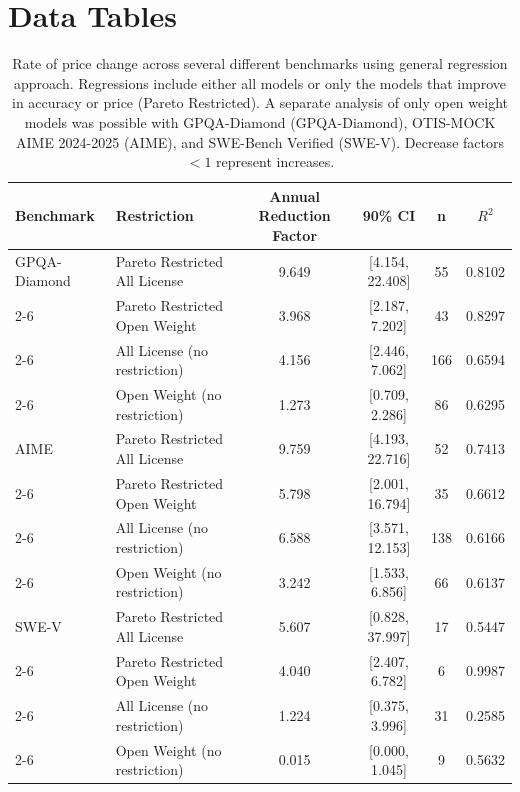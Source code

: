 \section{Data Tables}

\renewcommand{\arraystretch}{1.2}

\begin{table}[h!]
\centering
\caption{Rate of price change across several different benchmarks using general regression approach. Regressions include either all models or only the models that improve in accuracy or price (Pareto Restricted). A separate analysis of only open weight models was possible with GPQA-Diamond (GPQA-Diamond), OTIS-MOCK AIME 2024-2025 (AIME), and SWE-Bench Verified (SWE-V). Decrease factors $<1$ represent increases.}
\label{tab:regression_results}

\begin{tabular}{|l|l|c|c|c|c|}
\hline
\textbf{Benchmark} & \textbf{Restriction} & \textbf{Annual Reduction Factor} & \textbf{90\% CI} & \textbf{n} & \textbf{$R^2$} \\
\hline

GPQA-Diamond & Pareto Restricted All License & 9.649 & [4.154, 22.408] & 55 & 0.8102 \\ \cline{2-6}
\rowcolor{restrgray} \cellcolor{white} & Pareto Restricted Open Weight & 3.968 & [2.187, 7.202] & 43 & 0.8297 \\ \cline{2-6}
\cellcolor{white} & All License (no restriction) & 4.156 & [2.446, 7.062] & 166 & 0.6594 \\ \cline{2-6}
\rowcolor{restrgray} \cellcolor{white} & Open Weight (no restriction) & 1.273 & [0.709, 2.286] & 86 & 0.6295 \\
\hline

AIME & Pareto Restricted All License & 9.759 & [4.193, 22.716] & 52 & 0.7413 \\ \cline{2-6}
\rowcolor{restrgray} \cellcolor{white} & Pareto Restricted Open Weight & 5.798 & [2.001, 16.794] & 35 & 0.6612 \\ \cline{2-6}
\cellcolor{white} & All License (no restriction) & 6.588 & [3.571, 12.153] & 138 & 0.6166 \\ \cline{2-6}
\rowcolor{restrgray} \cellcolor{white} & Open Weight (no restriction) & 3.242 & [1.533, 6.856] & 66 & 0.6137 \\
\hline

SWE\mbox{-}V & Pareto Restricted All License & 5.607 & [0.828, 37.997] & 17 & 0.5447 \\ \cline{2-6}
\rowcolor{restrgray} \cellcolor{white} & Pareto Restricted Open Weight & 4.040 & [2.407, 6.782] & 6 & 0.9987 \\ \cline{2-6}
\cellcolor{white} & All License (no restriction) & 1.224 & [0.375, 3.996] & 31 & 0.2585 \\ \cline{2-6}
\rowcolor{restrgray} \cellcolor{white} & Open Weight (no restriction) & 0.015 & [0.000, 1.045] & 9 & 0.5632 \\
\hline

\end{tabular}
\end{table}

